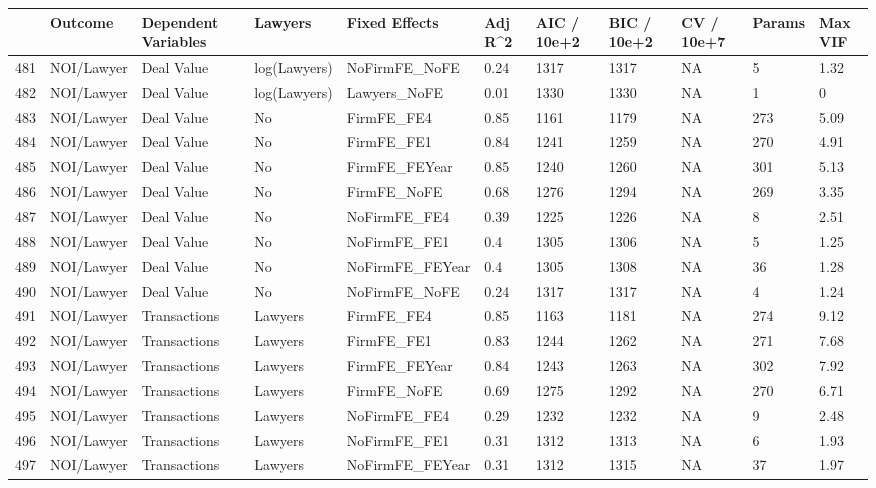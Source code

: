 \documentclass{article}
\begin{document}
\begin{table}[H]
\centering
\begin{tabular}{rllllllllll}
  \hline
 & Outcome & Dependent Variables & Lawyers & Fixed Effects & Adj R^2 & AIC / 10e+2 & BIC / 10e+2 & CV / 10e+7 & Params & Max VIF \\
  \hline
481 & NOI/Lawyer & Deal Value & log(Lawyers) & NoFirmFE\_NoFE & 0.24 & 1317 & 1317 & NA & 5 & 1.32 \\
  482 & NOI/Lawyer & Deal Value & log(Lawyers) & Lawyers\_NoFE & 0.01 & 1330 & 1330 & NA & 1 & 0 \\
  483 & NOI/Lawyer & Deal Value & No & FirmFE\_FE4 & 0.85 & 1161 & 1179 & NA & 273 & 5.09 \\
  484 & NOI/Lawyer & Deal Value & No & FirmFE\_FE1 & 0.84 & 1241 & 1259 & NA & 270 & 4.91 \\
  485 & NOI/Lawyer & Deal Value & No & FirmFE\_FEYear & 0.85 & 1240 & 1260 & NA & 301 & 5.13 \\
  486 & NOI/Lawyer & Deal Value & No & FirmFE\_NoFE & 0.68 & 1276 & 1294 & NA & 269 & 3.35 \\
  487 & NOI/Lawyer & Deal Value & No & NoFirmFE\_FE4 & 0.39 & 1225 & 1226 & NA & 8 & 2.51 \\
  488 & NOI/Lawyer & Deal Value & No & NoFirmFE\_FE1 & 0.4 & 1305 & 1306 & NA & 5 & 1.25 \\
  489 & NOI/Lawyer & Deal Value & No & NoFirmFE\_FEYear & 0.4 & 1305 & 1308 & NA & 36 & 1.28 \\
  490 & NOI/Lawyer & Deal Value & No & NoFirmFE\_NoFE & 0.24 & 1317 & 1317 & NA & 4 & 1.24 \\
  491 & NOI/Lawyer & Transactions & Lawyers & FirmFE\_FE4 & 0.85 & 1163 & 1181 & NA & 274 & 9.12 \\
  492 & NOI/Lawyer & Transactions & Lawyers & FirmFE\_FE1 & 0.83 & 1244 & 1262 & NA & 271 & 7.68 \\
  493 & NOI/Lawyer & Transactions & Lawyers & FirmFE\_FEYear & 0.84 & 1243 & 1263 & NA & 302 & 7.92 \\
  494 & NOI/Lawyer & Transactions & Lawyers & FirmFE\_NoFE & 0.69 & 1275 & 1292 & NA & 270 & 6.71 \\
  495 & NOI/Lawyer & Transactions & Lawyers & NoFirmFE\_FE4 & 0.29 & 1232 & 1232 & NA & 9 & 2.48 \\
  496 & NOI/Lawyer & Transactions & Lawyers & NoFirmFE\_FE1 & 0.31 & 1312 & 1313 & NA & 6 & 1.93 \\
  497 & NOI/Lawyer & Transactions & Lawyers & NoFirmFE\_FEYear & 0.31 & 1312 & 1315 & NA & 37 & 1.97 \\

\end{tabular}
\end{table}
\end{document}
